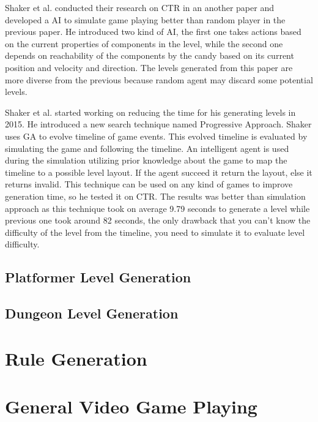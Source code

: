 Shaker et al. conducted their research on CTR in an another paper\cite{ctrSimulationApproach} and developed a AI to simulate game playing better than random player in the previous paper\cite{ctrAutomaticGeneration}. He introduced two kind of AI, the first one takes actions based on the current properties of components in the level, while the second one depends on reachability of the components by the candy based on its current position and velocity and direction. The levels generated from this paper are more diverse from the previous because random agent may discard some potential levels.\\\par

Shaker et al. started working on reducing the time for his generating levels in 2015\cite{ctrProgressiveApproach}. He introduced a new search technique named Progressive Approach. Shaker uses GA to evolve timeline of game events. This evolved timeline is evaluated by simulating the game and following the timeline. An intelligent agent is used during the simulation utilizing prior knowledge about the game to map the timeline to a possible level layout. If the agent succeed it return the layout, else it returns invalid. This technique can be used on any kind of games to improve generation time, so he tested it on CTR. The results was better than simulation approach as this technique took on average 9.79 seconds to generate a level while previous one \cite{ctrSimulationApproach} took around 82 seconds, the only drawback that you can't know the difficulty of the level from the timeline, you need to simulate it to evaluate level difficulty.\\\par

\subsection{Platformer Level Generation}

\subsection{Dungeon Level Generation}

\section{Rule Generation}

\section{General Video Game Playing}